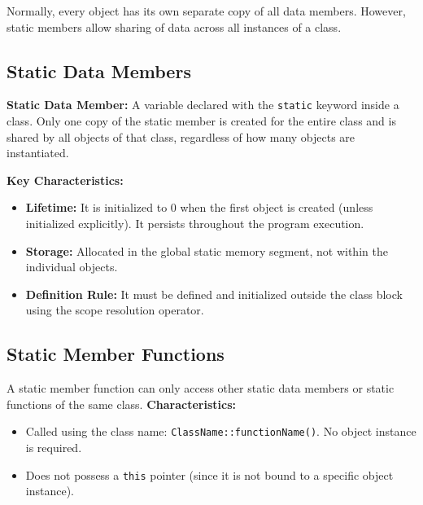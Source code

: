 \documentclass[12pt,a4paper]{article}
\begin{document}
Normally, every object has its own separate copy of all data members. However, static members allow sharing of data across all instances of a class.

\subsection{Static Data Members}
\begin{tcolorbox}[defbox]
\textbf{Static Data Member:} A variable declared with the \texttt{static} keyword inside a class. Only one copy of the static member is created for the entire class and is shared by all objects of that class, regardless of how many objects are instantiated.
\end{tcolorbox}
\textbf{Key Characteristics:}
\begin{itemize}[leftmargin=*, itemsep=2pt]
  \item \textbf{Lifetime:} It is initialized to 0 when the first object is created (unless initialized explicitly). It persists throughout the program execution.
  \item \textbf{Storage:} Allocated in the global static memory segment, not within the individual objects.
  \item \textbf{Definition Rule:} It must be defined and initialized outside the class block using the scope resolution operator.
\end{itemize}

\subsection{Static Member Functions}
A static member function can only access other static data members or static functions of the same class.
\textbf{Characteristics:}
\begin{itemize}[leftmargin=*, itemsep=2pt]
  \item Called using the class name: \texttt{ClassName::functionName()}. No object instance is required.
  \item Does not possess a \texttt{this} pointer (since it is not bound to a specific object instance).
\end{itemize}
\end{document}
